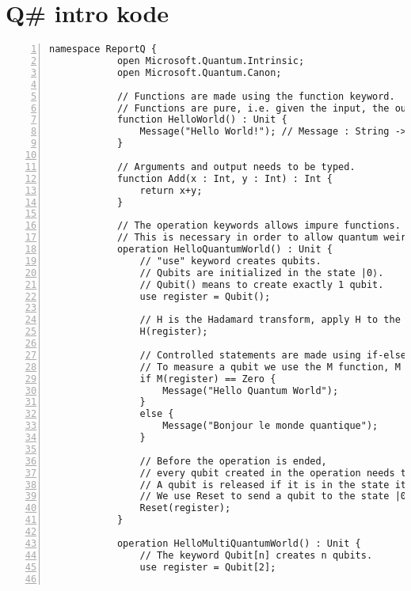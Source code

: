 \documentclass[
10pt, %
a4  paper, %
twoside, %
headinclude,footinclude, %
BCOR=5mm, %
]{scrartcl}
\begin{document}
\appendix

\section{Q\# intro kode}

    \begin{Verbatim}[gobble=2, numbers=left, frame=lines,
        framesep=3mm,
        label={[Beginning of code]End of code}]
        namespace ReportQ {
            open Microsoft.Quantum.Intrinsic;
            open Microsoft.Quantum.Canon;

            // Functions are made using the function keyword.
            // Functions are pure, i.e. given the input, the output should always be the same.
            function HelloWorld() : Unit {
                Message("Hello World!"); // Message : String -> Unit
            }

            // Arguments and output needs to be typed.
            function Add(x : Int, y : Int) : Int {
                return x+y;
            }

            // The operation keywords allows impure functions.
            // This is necessary in order to allow quantum weirdness.
            operation HelloQuantumWorld() : Unit {
                // "use" keyword creates qubits.
                // Qubits are initialized in the state |0⟩.
                // Qubit() means to create exactly 1 qubit.
                use register = Qubit();

                // H is the Hadamard transform, apply H to the register
                H(register);

                // Controlled statements are made using if-else
                // To measure a qubit we use the M function, M : Qubit -> Result.
                if M(register) == Zero {
                    Message("Hello Quantum World");
                }
                else {
                    Message("Bonjour le monde quantique");
                }

                // Before the operation is ended, 
                // every qubit created in the operation needs to be released.
                // A qubit is released if it is in the state it was initialized in.
                // We use Reset to send a qubit to the state |0⟩.
                Reset(register);
            }

            operation HelloMultiQuantumWorld() : Unit {
                // The keyword Qubit[n] creates n qubits.
                use register = Qubit[2];


\end{Verbatim}
\end{document}
